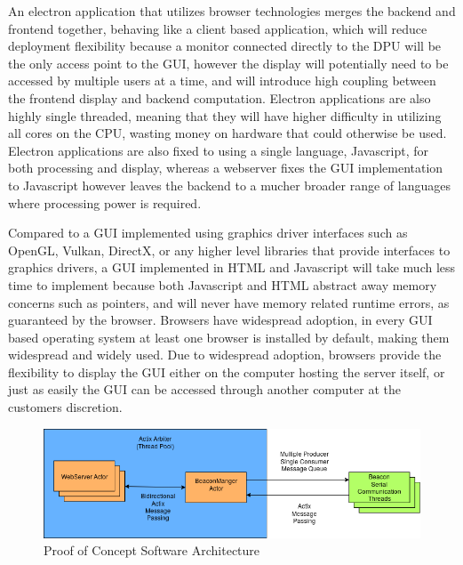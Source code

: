 \bigskip
An electron application that utilizes browser technologies merges the backend and frontend together, behaving like a client based application, which will reduce deployment flexibility because a monitor connected directly to the DPU will be the only access point to the GUI, however the display will potentially need to be accessed by multiple users at a time, and will introduce high coupling between the frontend display and backend computation.
Electron applications are also highly single threaded, meaning that they will have higher difficulty in utilizing all cores on the CPU, wasting money on hardware that could otherwise be used.
Electron applications are also fixed to using a single language, Javascript, for both processing and display, whereas a webserver fixes the GUI implementation to Javascript however leaves the backend to a mucher broader range of languages where processing power is required.

\pagebreak
Compared to a GUI implemented using graphics driver interfaces such as OpenGL, Vulkan, DirectX, or any higher level libraries that provide interfaces to graphics drivers, a GUI implemented in HTML and Javascript will take much less time to implement because both Javascript and HTML abstract away memory concerns such as pointers, and will never have memory related runtime errors, as guaranteed by the browser. Browsers have widespread adoption, in every GUI based operating system at least one browser is installed by default, making them widespread and widely used.
Due to widespread adoption, browsers provide the flexibility to display the GUI either on the computer hosting the server itself, or just as easily the GUI can be accessed through another computer at the customers discretion.

\bigskip
\begin{figure}[H]
	\centering
    \includegraphics[scale=0.55]{images/poc_arch.png}
    \caption{Proof of Concept Software Architecture}
    \label{software_poc_arch}
\end{figure}

